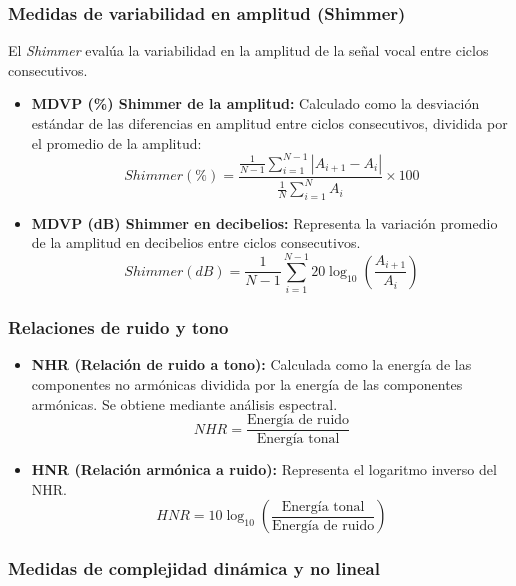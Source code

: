 \documentclass[listof=nochaptergap,12pt,times,authoryear]{report}
\begin{document}
\subsubsection{Medidas de variabilidad en amplitud (Shimmer)}

El \textit{Shimmer} evalúa la variabilidad en la amplitud de la señal vocal entre ciclos consecutivos.

\begin{itemize}
    \item \textbf{MDVP (\%) Shimmer de la amplitud:} Calculado como la desviación estándar de las diferencias en amplitud entre ciclos consecutivos, dividida por el promedio de la amplitud:
    \[
    Shimmer(\%) = \frac{\frac{1}{N-1} \sum_{i=1}^{N-1} |A_{i+1} - A_i|}{\frac{1}{N} \sum_{i=1}^N A_i} \times 100
    \]

    \item \textbf{MDVP (dB) Shimmer en decibelios:} Representa la variación promedio de la amplitud en decibelios entre ciclos consecutivos.
    \[
    Shimmer(dB) = \frac{1}{N-1} \sum_{i=1}^{N-1} 20 \log_{10} \left( \frac{A_{i+1}}{A_i} \right)
    \]
\end{itemize}

\subsubsection{Relaciones de ruido y tono}

\begin{itemize}
    \item \textbf{NHR (Relación de ruido a tono):} Calculada como la energía de las componentes no armónicas dividida por la energía de las componentes armónicas. Se obtiene mediante análisis espectral.
    \[
    NHR = \frac{\text{Energía de ruido}}{\text{Energía tonal}}
    \]

    \item \textbf{HNR (Relación armónica a ruido):} Representa el logaritmo inverso del NHR.
    \[
    HNR = 10 \log_{10} \left( \frac{\text{Energía tonal}}{\text{Energía de ruido}} \right)
    \]
\end{itemize}

\subsubsection{Medidas de complejidad dinámica y no lineal}
\end{document}
